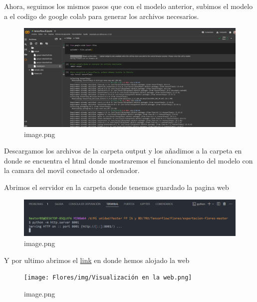 \documentclass[11pt]{article}
\begin{document}
    Ahora, seguimos los mismos pasos que con el modelo anterior, subimos el
modelo a el codigo de google colab para generar los archivos necesarios.

    \begin{figure}
\centering
\includegraphics{Flores/img/Generar Json.png}
\caption{image.png}
\end{figure}

    Descargamos los archivos de la carpeta output y los añadimos a la
carpeta en donde se encuentra el html donde mostraremos el
funcionamiento del modelo con la camara del movil conectado al
ordenador.

    Abrimos el servidor en la carpeta donde tenemos guardado la pagina web

    \begin{figure}
\centering
\includegraphics{Flores/img/Abrir servidor.png}
\caption{image.png}
\end{figure}

    Y por ultimo abrimos el \href{http://localhost:8001}{link} en donde
hemos alojado la web

    \begin{figure}
\centering
\texttt{[image: Flores/img/Visualización en la web.png]}
\caption{image.png}
\end{figure}
\end{document}
